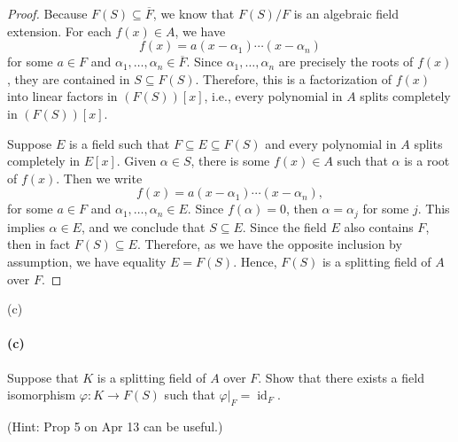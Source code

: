 \documentclass[12pt]{article}
\newenvironment{fullbox}{\begin{lrbox}{\savefullbox}\begin{minipage}{\dimexpr\textwidth-2\fboxsep\relax}}{\end{minipage}\end{lrbox}\begin{center}\framebox[\textwidth]{\usebox{\savefullbox}}\end{center}}
\newenvironment{pbox}[1][]{\begin{fullbox}\ifx#1\empty\else\paragraph{#1}\fi}{\end{fullbox}}
\theoremstyle{definition}
\renewcommand{\phi}{\varphi}
\DeclareMathOperator{\id}{id}
\newcommand{\clo}{\overline}
\begin{document}
\begin{proof}
    Because $F(S) \subseteq \clo{F}$, we know that $F(S)/F$ is an algebraic field extension. For each $f(x) \in A$, we have
    \[
        f(x) = a(x - \alpha_1) \cdots (x - \alpha_n)
    \]
    for some $a \in F$ and $\alpha_1, \dots, \alpha_n \in \clo{F}$. Since $\alpha_1, \dots, \alpha_n$ are precisely the roots of $f(x)$, they are contained in $S \subseteq F(S)$. Therefore, this is a factorization of $f(x)$ into linear factors in $(F(S))[x]$, i.e., every polynomial in $A$ splits completely in $(F(S))[x]$.

    Suppose $E$ is a field such that $F \subseteq E \subseteq F(S)$ and every polynomial in $A$ splits completely in $E[x]$. Given $\alpha \in S$, there is some $f(x) \in A$ such that $\alpha$ is a root of $f(x)$. Then we write
    \[
        f(x) = a(x - \alpha_1) \cdots (x - \alpha_n),
    \]
    for some $a \in F$ and $\alpha_1, \dots, \alpha_n \in E$. Since $f(\alpha) = 0$, then $\alpha = \alpha_j$ for some $j$. This implies $\alpha \in E$, and we conclude that $S \subseteq E$. Since the field $E$ also contains $F$, then in fact $F(S) \subseteq E$. Therefore, as we have the opposite inclusion by assumption, we have equality $E = F(S)$. Hence, $F(S)$ is a splitting field of $A$ over $F$.

\end{proof}

\begin{pbox}[(c)]
    Suppose that $K$ is a splitting field of $A$ over $F$. Show that there exists a field isomorphism $\phi : K \to F(S)$ such that $\phi|_F = \id_F$.
    
    (Hint: Prop 5 on Apr 13 can be useful.)
\end{pbox}
\end{document}
